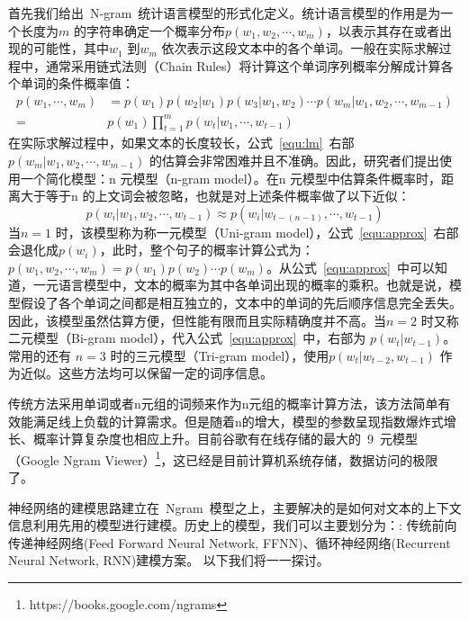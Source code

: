 首先我们给出~N-gram~统计语言模型的形式化定义。统计语言模型的作用是为一个长度为$m$ 的字符串确定一个概率分布$p(w_1,w_2,\cdots,w_m)$，以表示其存在或者出现的可能性，其中$w_1$ 到$w_m$ 依次表示这段文本中的各个单词。一般在实际求解过程中，通常采用链式法则（Chain Rules）将计算这个单词序列概率分解成计算各个单词的条件概率值：
\begin{equation}
\label{equ:lm}
\begin{split}
p(w_1,\cdots,w_m) &= p(w_1) p(w_2|w_1) p(w_3|w_1,w_2)\cdots p(w_m | w_1,w_2,\cdots,w_{m-1}) \\
=&p(w_1)\prod_{t=1}^{m}p(w_t|w_1,\cdots,w_{t-1})
\end{split}
\end{equation}
在实际求解过程中，如果文本的长度较长，公式~\ref{equ:lm}~右部$ p(w_m | w_1,w_2,\cdots,w_{m-1}) $ 的估算会非常困难并且不准确。因此，研究者们提出使用一个简化模型：n 元模型（n-gram model）。在n 元模型中估算条件概率时，距离大于等于n 的上文词会被忽略，也就是对上述条件概率做了以下近似：
\begin{equation}
\label{equ:approx}
p(w_i | w_1,w_2,\cdots,w_{t-1})  \approx p(w_i | w_{t-(n-1)},\cdots,w_{t-1})
\end{equation}
当$n = 1$ 时，该模型称为称一元模型（Uni-gram model），公式~\ref{equ:approx}~右部会退化成$p(w_i)$，此时，整个句子的概率计算公式为：$p(w_1,w_2,\cdots,w_m) = p(w_1)p(w_2) \cdots p(w_m)$。从公式~\ref{equ:approx}~中可以知道，一元语言模型中，文本的概率为其中各单词出现的概率的乘积。也就是说，模型假设了各个单词之间都是相互独立的，文本中的单词的先后顺序信息完全丢失。因此，该模型虽然估算方便，但性能有限而且实际精确度并不高。当$n = 2$ 时又称二元模型（Bi-gram model），代入公式~\ref{equ:approx}~中，右部为 $p(w_t|w_{t-1})$。常用的还有 $n = 3$ 时的三元模型（Tri-gram model），使用$p(w_t |w_{t-2},w_{t-1})$ 作为近似。这些方法均可以保留一定的词序信息。

传统方法采用单词或者n元组的词频来作为n元组的概率计算方法，该方法简单有效能满足线上负载的计算需求。但是随着n的增大，模型的参数呈现指数爆炸式增长、概率计算复杂度也相应上升。目前谷歌有在线存储的最大的~9~元模型（Google Ngram Viewer）\footnote{https://books.google.com/ngrams}，这已经是目前计算机系统存储，数据访问的极限了。


神经网络的建模思路建立在~Ngram~模型之上，主要解决的是如何对文本的上下文信息利用先用的模型进行建模。历史上的模型，我们可以主要划分为：: 传统前向传递神经网络(Feed Forward Neural Network, FFNN)、循环神经网络(Recurrent Neural Network, RNN)建模方案。 以下我们将一一探讨。


